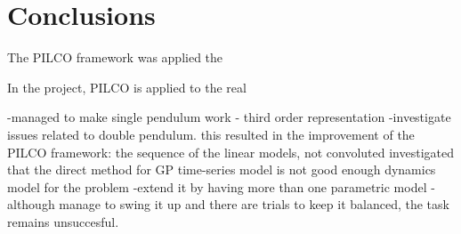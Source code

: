 \section{Conclusions}
\label{s:con}
The PILCO framework was applied the 

 


In the project, PILCO is applied to the real 


-managed to make single pendulum work - third order representation
-investigate issues related to double pendulum.
this resulted in the improvement of the PILCO framework: the sequence of the linear models,
not convoluted
investigated that the direct method for GP time-series model is not good enough dynamics model for the problem
-extend it by having more than one parametric model
-although manage to swing it up and there are trials to keep it balanced, the task remains unsuccesful. 